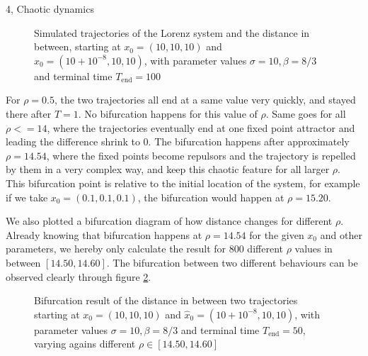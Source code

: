 \documentclass[10pt,a4paper]{article}
\begin{document}
\begin{task}{4, Chaotic dynamics}
\begin{figure} [H]
    \caption{Simulated trajectories of the Lorenz system and the distance in between, starting at $x_0=(10, 10, 10)$ and $\hat{x}_0=(10+10^{-8}, 10, 10)$, with parameter values $\sigma=10, \beta=8/3$ and terminal time $T_\text{end}=100$}
    \label{fig:task4-2-r}
\end{figure}

For $\rho=0.5$, the two trajectories all end at a same value very quickly, and stayed there after $T=1$. No bifurcation happens for this value of $\rho$. Same goes for all $\rho<=14$, where the trajectories eventually end at one fixed point attractor and leading the difference shrink to 0. The bifurcation happens after approximately $\rho=14.54$, where the fixed points become repulsors and the trajectory is repelled by them in a very complex way, and keep this chaotic feature for all larger $\rho$. This bifurcation point is relative to the initial location of the system, for example if we take $x_0=(0.1,0.1,0.1)$, the bifurcation would happen at $\rho=15.20$.

We also plotted a bifurcation diagram of how distance changes for different $\rho$. Already knowing that bifurcation happens at $\rho=14.54$ for the given $x_0$ and other parameters, we hereby only calculate the result for 800 different $\rho$ values in between $[14.50, 14.60]$. The bifurcation between two different behaviours can be observed clearly through figure \ref{fig:task4-2-b}. 

\begin{figure} [H]
    \centering
    \caption{Bifurcation result of the distance in between two trajectories starting at $x_0=(10, 10, 10)$ and $\hat{x}_0=(10+10^{-8}, 10, 10)$, with parameter values $\sigma=10, \beta=8/3$ and terminal time $T_\text{end}=50$, varying agains different $\rho\in [14.50, 14.60]$}
    \label{fig:task4-2-b}
\end{figure}


\end{task}
\end{document}
